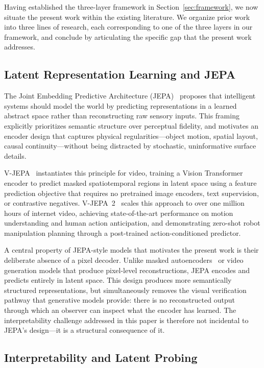 \documentclass{article}
\begin{document}
Having established the three-layer framework in
Section~\ref{sec:framework}, we now situate the present work within
the existing literature.
We organize prior work into three lines of research, each
corresponding to one of the three layers in our framework, and
conclude by articulating the specific gap that the present work
addresses.

\subsection{Latent Representation Learning and JEPA}

The Joint Embedding Predictive Architecture
(JEPA)~\cite{lecun2022path} proposes that intelligent systems should
model the world by predicting representations in a learned abstract
space rather than reconstructing raw sensory inputs.
This framing explicitly prioritizes semantic structure over perceptual
fidelity, and motivates an encoder design that captures physical
regularities---object motion, spatial layout, causal
continuity---without being distracted by stochastic, uninformative
surface details.

V-JEPA~\cite{bardes2024vjepa} instantiates this principle for video,
training a Vision Transformer encoder to predict masked spatiotemporal
regions in latent space using a feature prediction objective that
requires no pretrained image encoders, text supervision, or
contrastive negatives.
V-JEPA~2~\cite{assran2025vjepa2} scales this approach to over one
million hours of internet video, achieving state-of-the-art
performance on motion understanding and human action anticipation, and
demonstrating zero-shot robot manipulation planning through a
post-trained action-conditioned predictor.

A central property of JEPA-style models that motivates the present
work is their deliberate absence of a pixel decoder.
Unlike masked autoencoders~\cite{he2022mae} or video generation
models that produce pixel-level reconstructions, JEPA encodes and
predicts entirely in latent space.
This design produces more semantically structured representations, but
simultaneously removes the visual verification pathway that generative
models provide: there is no reconstructed output through which an
observer can inspect what the encoder has learned.
The interpretability challenge addressed in this paper is therefore
not incidental to JEPA's design---it is a structural consequence of
it.

\subsection{Interpretability and Latent Probing}
\end{document}
